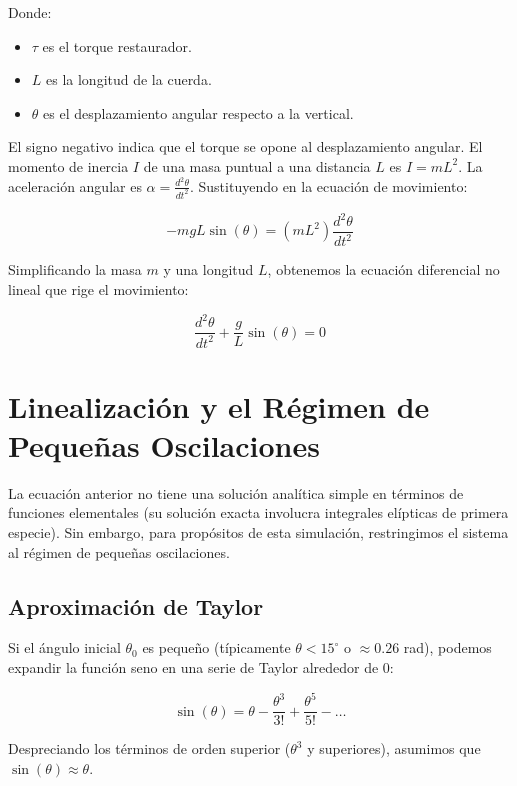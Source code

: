 \documentclass[12pt, a4paper]{article}
\begin{document}
	Donde:
	\begin{itemize}
		\item $\tau$ es el torque restaurador.
		\item $L$ es la longitud de la cuerda.
		\item $\theta$ es el desplazamiento angular respecto a la vertical.
	\end{itemize}
	
	El signo negativo indica que el torque se opone al desplazamiento angular. El momento de inercia $I$ de una masa puntual a una distancia $L$ es $I = mL^2$. La aceleración angular es $\alpha = \frac{d^2\theta}{dt^2}$. Sustituyendo en la ecuación de movimiento:
	
	\begin{equation}
		-mgL \sin(\theta) = (mL^2) \frac{d^2\theta}{dt^2}
	\end{equation}
	
	Simplificando la masa $m$ y una longitud $L$, obtenemos la ecuación diferencial no lineal que rige el movimiento:
	
	\begin{equation}
		\frac{d^2\theta}{dt^2} + \frac{g}{L} \sin(\theta) = 0
	\end{equation}
	
	\section{Linealización y el Régimen de Pequeñas Oscilaciones}
	
	La ecuación anterior no tiene una solución analítica simple en términos de funciones elementales (su solución exacta involucra integrales elípticas de primera especie). Sin embargo, para propósitos de esta simulación, restringimos el sistema al régimen de pequeñas oscilaciones.
	
	\subsection{Aproximación de Taylor}
	
	Si el ángulo inicial $\theta_0$ es pequeño (típicamente $\theta < 15^\circ$ o $\approx 0.26$ rad), podemos expandir la función seno en una serie de Taylor alrededor de 0:
	
	\begin{equation}
		\sin(\theta) = \theta - \frac{\theta^3}{3!} + \frac{\theta^5}{5!} - \dots
	\end{equation}
	
	Despreciando los términos de orden superior ($\theta^3$ y superiores), asumimos que $\sin(\theta) \approx \theta$.
	
\end{document}
